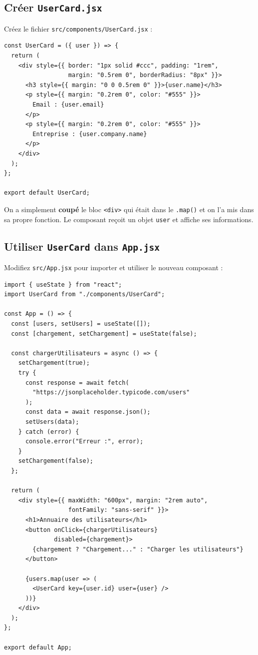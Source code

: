 \documentclass[11pt,a4paper]{article}
\begin{document}
\subsection{Créer \texttt{UserCard.jsx}}

Créez le fichier \texttt{src/components/UserCard.jsx} :

\begin{lstlisting}
const UserCard = ({ user }) => {
  return (
    <div style={{ border: "1px solid #ccc", padding: "1rem",
                  margin: "0.5rem 0", borderRadius: "8px" }}>
      <h3 style={{ margin: "0 0 0.5rem 0" }}>{user.name}</h3>
      <p style={{ margin: "0.2rem 0", color: "#555" }}>
        Email : {user.email}
      </p>
      <p style={{ margin: "0.2rem 0", color: "#555" }}>
        Entreprise : {user.company.name}
      </p>
    </div>
  );
};

export default UserCard;
\end{lstlisting}

On a simplement \textbf{coupé} le bloc \texttt{<div>} qui était dans le \texttt{.map()} et on l'a mis dans sa propre fonction. Le composant reçoit un objet \texttt{user} et affiche ses informations.

\subsection{Utiliser \texttt{UserCard} dans \texttt{App.jsx}}

Modifiez \texttt{src/App.jsx} pour importer et utiliser le nouveau composant :

\begin{lstlisting}
import { useState } from "react";
import UserCard from "./components/UserCard";

const App = () => {
  const [users, setUsers] = useState([]);
  const [chargement, setChargement] = useState(false);

  const chargerUtilisateurs = async () => {
    setChargement(true);
    try {
      const response = await fetch(
        "https://jsonplaceholder.typicode.com/users"
      );
      const data = await response.json();
      setUsers(data);
    } catch (error) {
      console.error("Erreur :", error);
    }
    setChargement(false);
  };

  return (
    <div style={{ maxWidth: "600px", margin: "2rem auto",
                  fontFamily: "sans-serif" }}>
      <h1>Annuaire des utilisateurs</h1>
      <button onClick={chargerUtilisateurs}
              disabled={chargement}>
        {chargement ? "Chargement..." : "Charger les utilisateurs"}
      </button>

      {users.map(user => (
        <UserCard key={user.id} user={user} />
      ))}
    </div>
  );
};

export default App;
\end{lstlisting}
\end{document}
